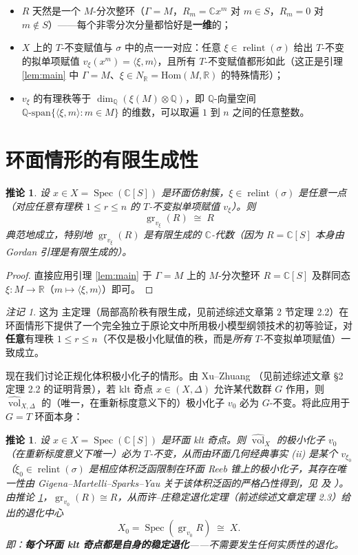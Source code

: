 \documentclass[11pt,a4paper]{article}
\newtheorem{corollary}[theorem]{推论}
\theoremstyle{definition}
\theoremstyle{remark}
\newtheorem{remark}[theorem]{注记}
\DeclareMathOperator{\vol}{vol}
\DeclareMathOperator{\Spec}{Spec}
\DeclareMathOperator{\gr}{gr}
\DeclareMathOperator{\relint}{relint}
\newcommand{\Q}{\mathbb{Q}}
\newcommand{\C}{\mathbb{C}}
\newcommand{\R}{\mathbb{R}}
\begin{document}
\begin{itemize}[leftmargin=1.6em]
  \item[(i)] $R$ 天然是一个 $M$-分次整环（$\Gamma=M$，$R_m=\C x^m$ 对 $m\in S$，$R_m=0$ 对 $m\notin S$）——每个非零分次分量都恰好是\textbf{一维}的；
  \item[(ii)] $X$ 上的 $T$-不变赋值与 $\sigma$ 中的点一一对应：任意 $\xi\in\relint(\sigma)$ 给出 $T$-不变的拟单项赋值 $v_\xi(x^m)=\langle\xi,m\rangle$，且所有 $T$-不变赋值都形如此（这正是引理 \ref{lem:main} 中 $\Gamma=M$、$\xi\in N_\R=\mathrm{Hom}(M,\R)$ 的特殊情形）；
  \item[(iii)] $v_\xi$ 的有理秩等于 $\dim_\Q(\xi(M)\otimes\Q)$，即 $\Q$-向量空间 $\Q\text{-span}\{\langle\xi,m\rangle:m\in M\}$ 的维数，可以取遍 $1$ 到 $n$ 之间的任意整数。
\end{itemize}

\section{环面情形的有限生成性}

\begin{corollary}\label{cor:toric-fg}
设 $x\in X=\Spec(\C[S])$ 是环面仿射簇，$\xi\in\relint(\sigma)$ 是任意一点（对应任意有理秩 $1\le r\le n$ 的 $T$-不变拟单项赋值 $v_\xi$）。则
\[
\gr_{v_\xi}(R) \;\cong\; R
\]
典范地成立，特别地 $\gr_{v_\xi}(R)$ 是有限生成的 $\C$-代数（因为 $R=\C[S]$ 本身由 Gordan 引理是有限生成的）。
\end{corollary}

\begin{proof}
直接应用引理 \ref{lem:main} 于 $\Gamma=M$ 上的 $M$-分次整环 $R=\C[S]$ 及群同态 $\xi:M\to\R$（$m\mapsto\langle\xi,m\rangle$）即可。
\end{proof}

\begin{remark}
这为 \cite{XZ2025} 主定理（局部高阶秩有限生成，见前述综述文章第 2 节定理 2.2）在环面情形下提供了一个完全独立于原论文中所用极小模型纲领技术的初等验证，对\textbf{任意}有理秩 $1\le r\le n$（不仅是极小化赋值的秩，而是\emph{所有} $T$-不变拟单项赋值）一致成立。
\end{remark}

现在我们讨论正规化体积极小化子的情形。由 Xu--Zhuang \cite[Corollary~1.2]{XZ2021}（见前述综述文章 \S2 定理 2.2 的证明背景），若 klt 奇点 $x\in(X,\Delta)$ 允许某代数群 $G$ 作用，则 $\widehat{\vol}_{X,\Delta}$ 的（唯一，在重新标度意义下的）极小化子 $v_0$ 必为 $G$-不变。将此应用于 $G=T$ 环面本身：

\begin{corollary}\label{cor:self-degenerate}
设 $x\in X=\Spec(\C[S])$ 是环面 klt 奇点。则 $\widehat{\vol}_X$ 的极小化子 $v_0$（在重新标度意义下唯一）必为 $T$-不变，从而由环面几何经典事实 (ii) 是某个 $v_{\xi_0}$（$\xi_0\in\relint(\sigma)$ 是相应体积泛函限制在环面 Reeb 锥上的极小化子，其存在唯一性由 Gigena--Martelli--Sparks--Yau 关于该体积泛函的严格凸性得到，见 \cite{Gigena1978,MSY2008} 及 \cite[Lemma~3.8]{LX2018}）。由推论 \ref{cor:toric-fg}，$\gr_{v_0}(R)\cong R$，从而许--庄稳定退化定理（前述综述文章定理 2.3）给出的退化中心
\[
X_0 = \Spec(\gr_{v_0}R) \;\cong\; X.
\]
即：\textbf{每个环面 klt 奇点都是自身的稳定退化}——不需要发生任何实质性的退化。
\end{corollary}
\end{document}
